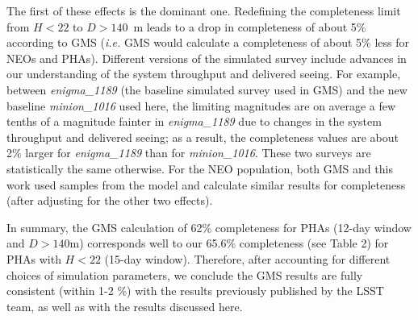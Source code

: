 The first of these effects is the dominant one.  Redefining the completeness limit from $H<22$ to $D>140$~m leads to a drop in completeness of about 5\% according to GMS ({\it i.e.} GMS would calculate a completeness of about 5\% less for NEOs and PHAs).
Different versions of the simulated survey include advances in our understanding of the system throughput and delivered seeing. For example, between {\it enigma\_1189} (the baseline simulated survey used in GMS) and the new baseline {\it minion\_1016} used here, the limiting magnitudes are on average a few tenths of a magnitude fainter in {\it enigma\_1189} due to changes in the system throughput and delivered seeing; as a result, the completeness values are about 2\% larger for {\it enigma\_1189} than for {\it minion\_1016}.
These two surveys are statistically the same otherwise.
For the NEO population, both GMS and this work used samples from the \cite{Grav2011} model and calculate similar results for completeness (after adjusting for the other two effects).

In summary, the GMS calculation of 62\% completeness for PHAs (12-day window and $D>140$m) corresponds
well to our 65.6\% completeness (see Table 2) for PHAs with $H<22$ (15-day window).  Therefore, after accounting
for different choices of simulation parameters, we conclude the GMS results are fully consistent (within 1-2 \%)
with the results previously published by the LSST team, as well as with the results discussed here.
